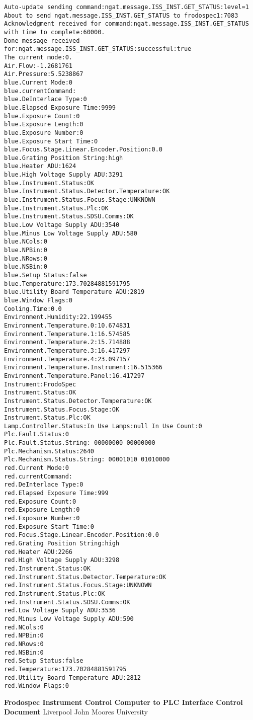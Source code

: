 \documentclass[10pt,a4paper]{article}
\begin{document}
\begin{verbatim}
Auto-update sending command:ngat.message.ISS_INST.GET_STATUS:level=1
About to send ngat.message.ISS_INST.GET_STATUS to frodospec1:7083
Acknowledgment received for command:ngat.message.ISS_INST.GET_STATUS with time to complete:60000.
Done message received for:ngat.message.ISS_INST.GET_STATUS:successful:true
The current mode:0.
Air.Flow:-1.2681761
Air.Pressure:5.5238867
blue.Current Mode:0
blue.currentCommand:
blue.DeInterlace Type:0
blue.Elapsed Exposure Time:9999
blue.Exposure Count:0
blue.Exposure Length:0
blue.Exposure Number:0
blue.Exposure Start Time:0
blue.Focus.Stage.Linear.Encoder.Position:0.0
blue.Grating Position String:high
blue.Heater ADU:1624
blue.High Voltage Supply ADU:3291
blue.Instrument.Status:OK
blue.Instrument.Status.Detector.Temperature:OK
blue.Instrument.Status.Focus.Stage:UNKNOWN
blue.Instrument.Status.Plc:OK
blue.Instrument.Status.SDSU.Comms:OK
blue.Low Voltage Supply ADU:3540
blue.Minus Low Voltage Supply ADU:580
blue.NCols:0
blue.NPBin:0
blue.NRows:0
blue.NSBin:0
blue.Setup Status:false
blue.Temperature:173.70284881591795
blue.Utility Board Temperature ADU:2819
blue.Window Flags:0
Cooling.Time:0.0
Environment.Humidity:22.199455
Environment.Temperature.0:10.674831
Environment.Temperature.1:16.574585
Environment.Temperature.2:15.714888
Environment.Temperature.3:16.417297
Environment.Temperature.4:23.097157
Environment.Temperature.Instrument:16.515366
Environment.Temperature.Panel:16.417297
Instrument:FrodoSpec
Instrument.Status:OK
Instrument.Status.Detector.Temperature:OK
Instrument.Status.Focus.Stage:OK
Instrument.Status.Plc:OK
Lamp.Controller.Status:In Use Lamps:null In Use Count:0
Plc.Fault.Status:0
Plc.Fault.Status.String: 00000000 00000000
Plc.Mechanism.Status:2640
Plc.Mechanism.Status.String: 00001010 01010000
red.Current Mode:0
red.currentCommand:
red.DeInterlace Type:0
red.Elapsed Exposure Time:999
red.Exposure Count:0
red.Exposure Length:0
red.Exposure Number:0
red.Exposure Start Time:0
red.Focus.Stage.Linear.Encoder.Position:0.0
red.Grating Position String:high
red.Heater ADU:2266
red.High Voltage Supply ADU:3298
red.Instrument.Status:OK
red.Instrument.Status.Detector.Temperature:OK
red.Instrument.Status.Focus.Stage:UNKNOWN
red.Instrument.Status.Plc:OK
red.Instrument.Status.SDSU.Comms:OK
red.Low Voltage Supply ADU:3536
red.Minus Low Voltage Supply ADU:590
red.NCols:0
red.NPBin:0
red.NRows:0
red.NSBin:0
red.Setup Status:false
red.Temperature:173.70284881591795
red.Utility Board Temperature ADU:2812
red.Window Flags:0
\end{verbatim}

\begin{thebibliography}{99}

 {\bf Frodospec Instrument Control Computer to PLC Interface Control Document}
Liverpool John Moores University 

\end{thebibliography}
\end{document}
